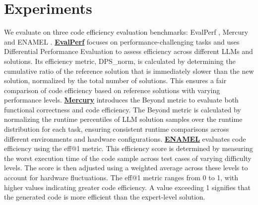 \section{Experiments}

We evaluate \tool on three code efficiency evaluation benchmarks: EvalPerf \cite{liu2024evaluatinglanguagemodelsefficient}, Mercury \cite{du2024mercury} and ENAMEL \cite{qiu2024efficientllmgeneratedcoderigorous}. \textbf{\uline{EvalPerf}} focuses on performance-challenging tasks and uses Differential Performance Evaluation to assess efficiency across different LLMs and solutions. Its efficiency metric, DPS\_norm, is calculated by determining the cumulative ratio of the reference solution that is immediately slower than the new solution, normalized by the total number of solutions. This ensures a fair comparison of code efficiency based on reference solutions with varying performance levels. \textbf{\uline{Mercury}} introduces the Beyond metric to evaluate both functional correctness and code efficiency. The Beyond metric is calculated by normalizing the runtime percentiles of LLM solution samples over the runtime distribution for each task, ensuring consistent runtime comparisons across different environments and hardware configurations. \textbf{\uline{ENAMEL}} evaluates code efficiency using the eff@1 metric. This efficiency score is determined by measuring the worst execution time of the code sample across test cases of varying difficulty levels. The score is then adjusted using a weighted average across these levels to account for hardware fluctuations. The eff@1 metric ranges from 0 to 1, with higher values indicating greater code efficiency. A value exceeding 1 signifies that the generated code is more efficient than the expert-level solution.




